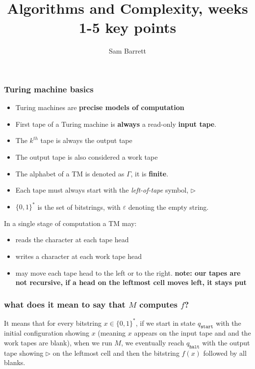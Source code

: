 \message{ !name(AlgComplexAllFlashCards.tex)}\documentclass{beamer}
\title{Algorithms and Complexity, weeks 1-5 key points}
\author{Sam Barrett}
\newcommand{\qs}{q_{\texttt{start}}}
\newcommand{\qh}{q_{\texttt{halt}}}
\begin{document}

\maketitle

\begin{frame}[allowframebreaks]
  \frametitle{Turing machine basics}

  \begin{itemize}
    \item Turing machines are \textbf{precise models of computation}
    \item First tape of a Turing machine is \textbf{always} a read-only \textbf{input tape}.
    \item The $k^{th}$ tape is always the output tape
    \item The output tape is also considered a work tape
    \item The alphabet of a TM is denoted as \(\Gamma\), it is \textbf{finite}.
    \item Each tape must always start with the \textit{left-of-tape} symbol, $\rhd$
    \item $\{ 0,1 \} ^{*}$ is the set of bitstrings, with $\varepsilon$ denoting the empty string.
  \end{itemize}

  \framebreak

  In a single stage of computation a TM may:
  \begin{itemize}
    \item reads the character at each tape head
    \item writes a character at each work tape head
    \item may move each tape head to the left or to the right. \textbf{note: our tapes are not recursive, if a head on the leftmost cell moves left, it stays put}
  \end{itemize}

\end{frame}

\begin{frame}
\frametitle{what does it mean to say that $M$ \textbf{computes} $f$?}

It means that for every bitstring $x \in \{ 0,1 \}^{*}$, if we start in state $\qs$ with the initial configuration showing $x$ (meaning $x$ appears on the input tape and and the work tapes are blank), when we run $M$, we eventually reach $\qh$ with the output tape showing $\rhd$ on the leftmost cell and then the bitstring $f(x)$ followed by all blanks.

\end{frame}
\end{document}

